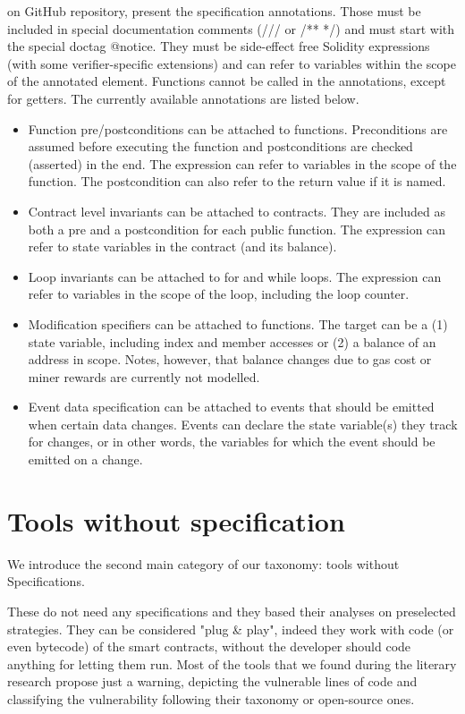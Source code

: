 \citet{SolcVerify_3} on GitHub repository, present the specification annotations. Those must be included in special documentation comments (/// or /** */) and must start with the special doctag @notice. 
They must be side-effect free Solidity expressions (with some verifier-specific extensions) and can refer to variables within the scope of the annotated element. Functions cannot be called in the annotations, except for getters.
The currently available annotations are listed below. 

\begin{itemize}
    \item Function pre/postconditions can be attached to functions. Preconditions are assumed before executing the function and postconditions are checked (asserted) in the end. The expression can refer to variables in the scope of the function. The postcondition can also refer to the return value if it is named.
    \item Contract level invariants can be attached to contracts. They are included as both a pre and a postcondition for each public function. The expression can refer to state variables in the contract (and its balance).
    \item Loop invariants can be attached to for and while loops. The expression can refer to variables in the scope of the loop, including the loop counter.
    \item Modification specifiers can be attached to functions. The target can be a (1) state variable, including index and member accesses or (2) a balance of an address in scope. Notes, however, that balance changes due to gas cost or miner rewards are currently not modelled.
    \item Event data specification can be attached to events that should be emitted when certain data changes. 
    Events can declare the state variable(s) they track for changes, or in other words, the variables for which the event should be emitted on a change.
\end{itemize}

\section{Tools without specification}
\label{sec:Tools:WithoutSpecification}
We introduce the second main category of our taxonomy: tools without Specifications.

These do not need any specifications and they based their analyses on preselected strategies. They can be considered "plug \& play", 
indeed they work with code (or even bytecode) of the smart contracts, without the developer should code anything for letting them run. 
Most of the tools that we found during the literary research propose just a warning, depicting the vulnerable lines of code and classifying 
the vulnerability following their taxonomy or open-source ones.



